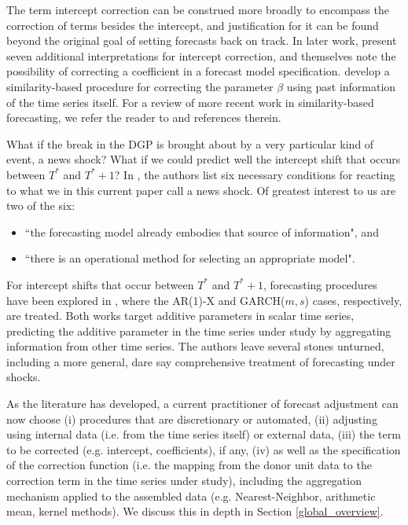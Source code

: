 \documentclass[11pt]{article}
\theoremstyle{definition}
\begin{document}
The term intercept correction can be construed more broadly to encompass the correction of terms besides the intercept, and justification for it can be found beyond the original goal of setting forecasts back on track.  In later work, \cite{clements1999forecasting} present seven additional interpretations for intercept correction, and \cite{hendry1994theory, clements1999forecasting} themselves note the possibility of correcting a coefficient in a forecast model specification. \cite{guerron2017macroeconomic} develop a similarity-based procedure for correcting the parameter $\beta$ using past information of the time series itself.   For a review of more recent work in similarity-based forecasting, we refer the reader to \cite{lundquist2024volatility} and references therein.

What if the break in the DGP is brought about by a very particular kind of event, a news shock?   What if we could predict well the intercept shift that occurs between $T^{*}$ and $T^{*}+1$?  In \cite{castle2016overview}, the authors list six necessary conditions for reacting to what we in this current paper call a news shock.  Of greatest interest to us are two of the six: 

\begin{itemize}
\item ``the forecasting model already embodies that source of information", and 
\item ``there is an operational method for selecting an appropriate model".
\end{itemize}   

For intercept shifts that occur between $T^{*}$ and $T^{*}+1$, forecasting procedures have been explored in \cite{lin2021minimizing,lundquist2024volatility}, where the AR(1)-X and GARCH($m,s$) cases, respectively, are treated.  Both works target additive parameters in scalar time series, predicting the additive parameter in the time series under study by aggregating information from other time series.  The authors leave several stones unturned, including a more general, dare say comprehensive treatment of forecasting under shocks.

As the literature has developed, a current practitioner of forecast adjustment can now choose (i) procedures that are discretionary or automated, (ii) adjusting using internal data (i.e. from the time series itself) or external data, (iii) the term to be corrected (e.g. intercept, coefficients), if any, (iv) as well as the specification of the correction function (i.e. the mapping from the donor unit data to the correction term in the time series under study), including the aggregation mechanism applied to the assembled data (e.g. Nearest-Neighbor, arithmetic mean, kernel methods).  We discuss this in depth in Section \ref{global_overview}.
\end{document}
